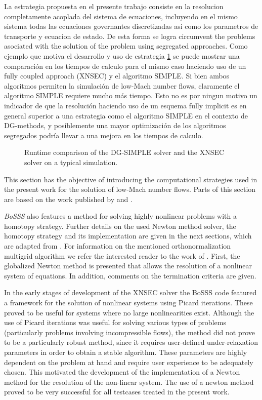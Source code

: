 La estrategia propuesta en el presente trabajo consiste en la resolucion completamente acoplada del sistema de ecuaciones, incluyendo en el mismo sistema todas las ecuaciones governantes discretizadas asi como los parametros de transporte y ecuacion de estado. De esta forma se logra circumvent the problems asociated with the solution of the problem using segregated approaches. Como ejemplo que motiva el desarrollo y uso de estrategia \cref{fig:RuntimeComparisonk2} se puede mostrar una comparación en los tiempos de calculo para el mismo caso haciendo uso de un fully coupled approach (XNSEC) y el algoritmo SIMPLE. Si bien ambos algoritmos permiten la simulación de low-Mach number flows, claramente el algoritmo SIMPLE requiere mucho más tiempo. Esto no es por ningun motivo un indicador de que la resolución haciendo uso de un esquema fully implicit es en general superior a una estrategia como el algoritmo SIMPLE en el contexto de DG-methods, y posiblemente una mayor optimización de los algoritmos segregados podría llevar a una mejora en los tiempos de calculo.

\begin{figure}[h]	
	\centering
	\caption{Runtime comparison of the DG-SIMPLE solver and the XNSEC solver on a typical simulation.}
	\label{fig:RuntimeComparisonk2}
\end{figure}

This section has the objective of introducing the computational strategies used in the present work for the solution of low-Mach number flows. Parts of this section are based on the work published by \textcite{kikkerFullyCoupledHighorder} and \textcite{gutierrez-jorqueraFullyCoupledHigh2022}.

\textit{BoSSS} also features a method for solving highly nonlinear problems with a homotopy strategy.
Further details on the used Newton method solver, the homotopy strategy and its implementation are given in the next sections, which are adapted from \textcite{kikkerFullyCoupledHighorder}. For information on the mentioned orthonormalization multigrid algorithm we refer the interested reader to the work of \textcite{kummerBoSSSPackageMultigrid2021}.
First, the globalized Newton method is presented that allows the resolution of a nonlinear system of equations. In addition, comments on the termination criteria are given.


In the early stages of development of the XNSEC solver the BoSSS code featured a framework for the solution of nonlinear systems using Picard iterations. These proved to be useful for systems where no large nonlinearities exist. Although the use of Picard iterations was useful for solving various types of problems (particularly problems involving incompressible flows), the method did not prove to be a particularly robust method, since it requires user-defined under-relaxation parameters in order to obtain a stable algorithm. These parameters are highly dependent on the problem at hand and require user experience to be adequately chosen.
This motivated the development of the implementation of a Newton method for the resolution of the non-linear system. The use of a newton method proved to be very successful for all testcases treated in the present work. 

